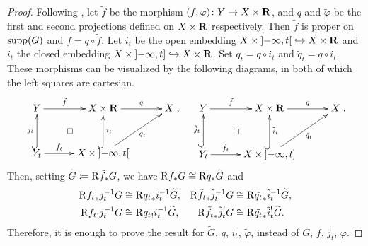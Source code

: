 \begin{proof}
  Following \cite{KS90}, let \(\tilde{f}\) be the morphism \(
    (f,\varphi)\colon Y\to X\times \rr
  \), and \(q\) and \(\tilde{\varphi}\) be 
  the first and second projections 
  defined on \(X\times \rr\) respectively. 
  Then \(\tilde{f}\) is proper on \(\supp(G)\) and 
  \(f=q\circ \tilde{f}\). 
  Let \(i_t\) be the open embedding \(
    X\times\lopen -\infty, t\ropen\hookrightarrow X\times \rr
  \) and \(\tilde{i}_t\) the closed embedding \(
    X\times\lopen -\infty, t\rclosed\hookrightarrow X\times \rr
  \). Set \(q_t=q\circ i_t\) and \(\tilde{q}_t=q\circ\tilde{i}_t\). 
  These morphisms can be visualized 
  by the following diagrams, in both of which the left squares are cartesian.
  \[\xymatrix@C=30pt@R=30pt{
    Y
      \ar[r]^-{\tilde{f}}
      \ar@{}[rd]|\square
    &
    X\times\rr
      \ar[r]^-{q}
    &
    X\\
    Y_{t}
      \ar@{^(->}[u]^-{j_t}
      \ar[r]^-{\hat{f}_{t}}
    &
    X\times \lopen-\infty,t\ropen
      \ar@{^(->}[u]_-{i_{t}}
      \ar[ur]_-{q_{t}}
    &
  },\quad
  \xymatrix@C=30pt@R=30pt{
    Y
      \ar[r]^-{\tilde{f}}
      \ar@{}[rd]|\square
    &
    X\times\rr
      \ar[r]^-{q}
    &
    X\\
    \widetilde{Y}_{t}
      \ar@{^(->}[u]^-{\tilde{j}_t}
      \ar[r]^-{\check{f}_{t}}
    &
    X\times \lopen-\infty,t\rclosed
      \ar@{^(->}[u]_-{\tilde{i}_{t}}
      \ar[ur]_-{\tilde{q}_{t}}
    &
  }.\]
  Then, setting \(
    \widetilde{G}\coloneqq \Rder[]{\tilde{f}_{\ast}}G
  \), we have \(
    \Rder[]{f_{\ast}}G
    \cong 
    \Rder[]{q_{\ast}}\widetilde{G}
  \) and
  \begin{align*}
    \Rder[]{{f_{t}}_{\ast}}j_{t}^{-1}G
    &\cong 
    \Rder[]{{q_{t}}_{\ast}}i_{t}^{-1}\widetilde{G},
    &
    \Rder[]{\tilde{f_{t}}_{\ast}}\tilde{j}_{t}^{-1}G
    &\cong 
    \Rder[]{\tilde{q_{t}}_{\ast}}\tilde{i}_{t}^{-1}\widetilde{G},
    \\
    \Rder[]{{f_{t}}_{!}}j_{t}^{-1}G
    &\cong 
    \Rder[]{{q_{t}}_{!}}i_{t}^{-1}\widetilde{G},
    &
    \Rder[]{\tilde{f_{t}}_{\ast}}\tilde{j}_{t}^{!}G
    &\cong 
    \Rder[]{\tilde{q_{t}}_{\ast}}\tilde{i}_{t}^{!}\widetilde{G}.
  \end{align*}
  Therefore, it is enough to prove the result 
  for \(\widetilde{G}\), \(q\), \(i_t\), \(\tilde{\varphi}\), instead of \(G\), \(f\), \(j_t\), \(\varphi\). 


\end{proof}
